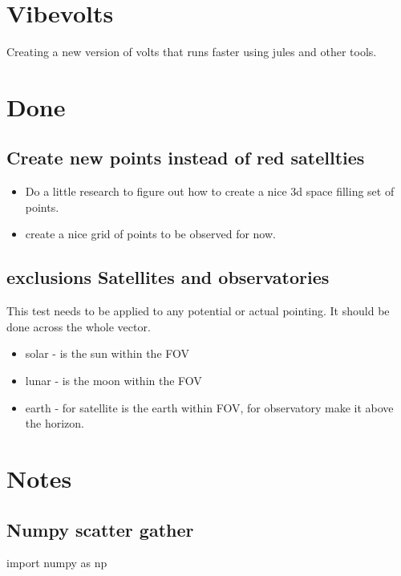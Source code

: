 \documentclass[11pt]{article}
\author{Earl Spillar0}
\date{\today}
\title{}
\begin{document}
\tableofcontents

\section{Vibevolts}
\label{sec:org60fb6a1}

Creating a new version of volts that runs faster using jules and other tools.




\section{Done}
\label{sec:org6d24507}
\subsection{Create new points instead of red satellties}
\label{sec:orga83837c}
\begin{itemize}
\item Do a little research to figure out how to create a nice 3d
space filling set of points.
\item create a nice grid of points to be observed for now.
\end{itemize}

\subsection{exclusions Satellites and observatories}
\label{sec:orgc67642f}
This test needs to be applied to any potential or actual pointing.
It should be done across the whole vector.
\begin{itemize}
\item solar - is the sun within the FOV
\item lunar - is the moon within the FOV
\item earth - for satellite is the earth within FOV, for observatory
make it above the horizon.
\end{itemize}



\section{Notes}
\label{sec:org2123918}

\subsection{Numpy scatter gather}
\label{sec:orgf62795e}
import numpy as np
\end{document}
